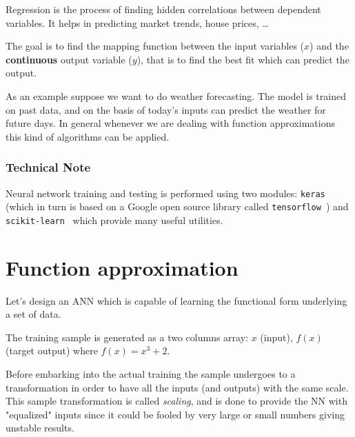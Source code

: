 Regression is the process of finding hidden correlations between dependent variables. It helps in predicting market trends, house prices, \ldots

The goal is to find the mapping function between the input variables (\(x\)) and the \textbf{continuous} output variable (\(y\)), that is to find the best fit which can predict the output.

As an example suppose we want to do weather forecasting. The model is trained on past data, and on the basis of today's inputs can predict the weather for future days. In general whenever we are dealing with function approximations this kind of algorithms can be applied.

\begin{attention}
\subsubsection{Technical Note}
\label{technical-note}

Neural network training and testing is performed using two modules: \texttt{keras}~\cite{bib:keras} (which in turn is based on a Google open source library called \texttt{tensorflow}~\cite{bib:tensorflow}) and \texttt{scikit-learn}~\cite{bib:scikit} which provide many useful utilities.
\end{attention}

\section{Function approximation}
\label{function-approximation}

Let's design an ANN which is capable of learning the functional form underlying a set of data. 

The training sample is generated as a two columns array: \(x\) (input), \(f(x)\) (target output) where \(f(x) = x^3 +2\). 

Before embarking into the actual training the sample undergoes to a transformation in order to have all the inputs (and outputs) with the same scale. This sample transformation is called \emph{scaling}, and is done to provide the NN with "equalized" inputs since it could be fooled by very large or small numbers giving unstable results.

